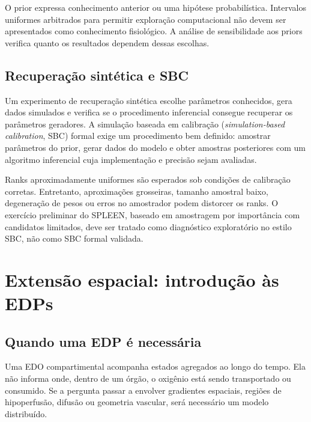 \documentclass[11pt,a4paper,oneside]{book}
\begin{document}
O prior expressa conhecimento anterior ou uma hipótese probabilística. Intervalos uniformes arbitrados para permitir exploração computacional não devem ser apresentados como conhecimento fisiológico. A análise de sensibilidade aos priors verifica quanto os resultados dependem dessas escolhas.

\section{Recuperação sintética e SBC}
Um experimento de recuperação sintética escolhe parâmetros conhecidos, gera dados simulados e verifica se o procedimento inferencial consegue recuperar os parâmetros geradores. A simulação baseada em calibração (\textit{simulation-based calibration}, SBC) formal exige um procedimento bem definido: amostrar parâmetros do prior, gerar dados do modelo e obter amostras posteriores com um algoritmo inferencial cuja implementação e precisão sejam avaliadas.

Ranks aproximadamente uniformes são esperados sob condições de calibração corretas. Entretanto, aproximações grosseiras, tamanho amostral baixo, degeneração de pesos ou erros no amostrador podem distorcer os ranks. O exercício preliminar do SPLEEN, baseado em amostragem por importância com candidatos limitados, deve ser tratado como diagnóstico exploratório no estilo SBC, não como SBC formal validada.

\chapter{Extensão espacial: introdução às EDPs}

\section{Quando uma EDP é necessária}
Uma EDO compartimental acompanha estados agregados ao longo do tempo. Ela não informa onde, dentro de um órgão, o oxigênio está sendo transportado ou consumido. Se a pergunta passar a envolver gradientes espaciais, regiões de hipoperfusão, difusão ou geometria vascular, será necessário um modelo distribuído.
\end{document}
